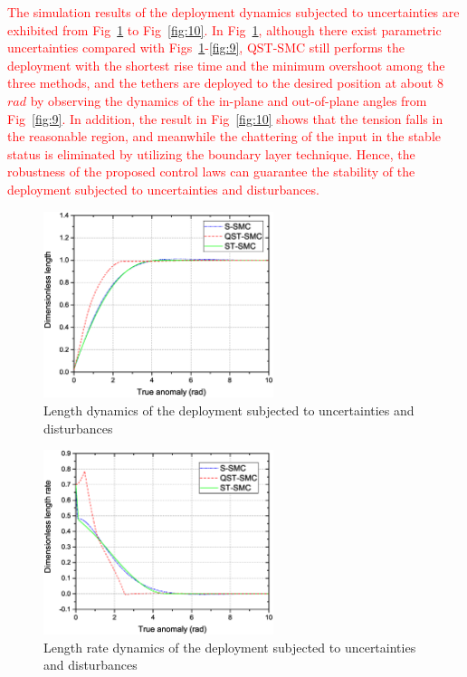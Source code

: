 \documentclass[3p]{elsarticle}
\theoremstyle{plain}
\theoremstyle{remark}
\begin{document}
\textcolor{red}{
The simulation results of the deployment dynamics subjected to uncertainties are exhibited from Fig~\ref{fig:7} to Fig~\ref{fig:10}. In Fig~\ref{fig:7}, although there exist parametric uncertainties compared with Figs~\ref{fig:7}-\ref{fig:9}, QST-SMC still performs the deployment with the shortest rise time and the minimum overshoot among the three methods, and the tethers are deployed to the desired position at about 8 $rad$ by observing the dynamics of the in-plane and out-of-plane angles from Fig~\ref{fig:9}. In addition, the result in Fig~\ref{fig:10} shows that the tension falls in the reasonable region, and meanwhile the chattering of the input in the stable status is eliminated by utilizing the boundary layer technique. Hence, the robustness of the proposed control laws can guarantee the stability of the deployment subjected to uncertainties and disturbances.}
\begin{figure}
\centering
\includegraphics[width=0.6\textwidth]{paper4_fig7_20161025.eps}
\caption{Length dynamics of the deployment subjected to uncertainties and disturbances}
\label{fig:7}
\end{figure}
\begin{figure}
\centering
\includegraphics[width=0.6\textwidth]{paper4_fig8_20161025.eps}
\caption{Length rate dynamics of the deployment subjected to uncertainties and disturbances}
\label{fig:8}
\end{figure}
\end{document}
